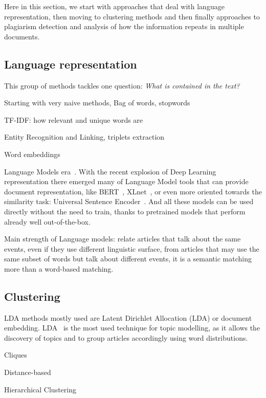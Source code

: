 Here in this section, we start with approaches that deal with language representation, then moving to clustering methods and then finally approaches to plagiarism detection and analysis of how the information repeats in multiple documents.

\subsection{Language representation}

This group of methods tackles one question: \emph{What is contained in the text?}

Starting with very naive methods,
Bag of words, stopwords

TF-IDF: how relevant and unique words are\cite{jones1972statistical}

Entity Recognition and Linking, triplets extraction

Word embeddings

Language Models era~\cite{devlin2018bert,cer2018universal,yang2019xlnet}.
With the recent explosion of Deep Learning representation there emerged many of Language Model tools that can provide document representation, like BERT~\cite{devlin2018bert}, XLnet~\cite{yang2019xlnet}, or even more oriented towards the similarity task: Universal Sentence Encoder~\cite{cer2018universal}.
And all these models can be used directly without the need to train, thanks to pretrained models that perform already well out-of-the-box.

Main strength of Language models:
relate articles that talk about the same events, even if they use different linguistic surface, from articles that may use the same subset of words but talk about different events, it is a semantic matching more than a word-based matching. 

\subsection{Clustering}

LDA
methods mostly used are Latent Dirichlet Allocation (LDA) or document embedding.
LDA~\cite{blei2003latent} is the most used technique for topic modelling, as it allows the discovery of topics and to group articles accordingly using word distributions.

Cliques

Distance-based

Hierarchical Clustering

